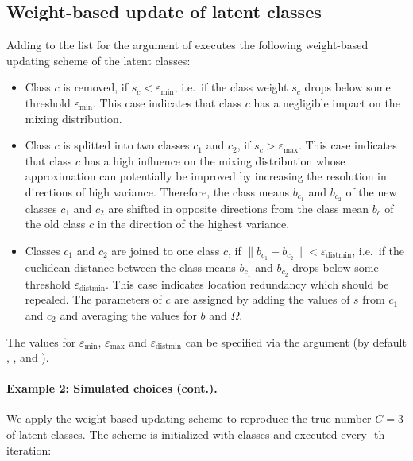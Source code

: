 \documentclass[article,shortnames]{jss}
\newcommand{\fct}[1]{\code{#1()}}
\begin{document}
\subsection{Weight-based update of latent classes} \label{subsec:weight_update}

Adding  to the list for the  argument of \fct{fit\_model} executes the following weight-based updating scheme of the latent classes:

\begin{itemize}
  \item Class $c$ is removed, if $s_c<\varepsilon_{\text{min}}$, i.e.\ if the class weight $s_c$ drops below some threshold $\varepsilon_{\text{min}}$. This case indicates that class $c$ has a negligible impact on the mixing distribution.
  \item Class $c$ is splitted into two classes $c_1$ and $c_2$, if $s_c>\varepsilon_\text{max}$. This case indicates that class $c$ has a high influence on the mixing distribution whose approximation can potentially be improved by increasing the resolution in directions of high variance. Therefore, the class means $b_{c_1}$ and $b_{c_2}$ of the new classes $c_1$ and $c_2$ are shifted in opposite directions from the class mean $b_c$ of the old class $c$ in the direction of the highest variance.
  \item Classes $c_1$ and $c_2$ are joined to one class $c$, if $\lVert b_{c_1} - b_{c_2} \rVert<\varepsilon_{\text{distmin}}$, i.e.\ if the euclidean distance between the class means $b_{c_1}$ and $b_{c_2}$  drops below some threshold $\varepsilon_{\text{distmin}}$. This case indicates location redundancy which should be repealed. The parameters of $c$ are assigned by adding the values of $s$ from $c_1$ and $c_2$ and averaging the values for $b$ and $\Omega$.
\end{itemize}

The values for $\varepsilon_{\text{min}}$, $\varepsilon_{\text{max}}$ and $\varepsilon_{\text{distmin}}$ can be specified via the  argument (by default , , and ).

\paragraph{Example 2: Simulated choices (cont.).}

We apply the weight-based updating scheme to reproduce the true number $C = 3$ of latent classes. The scheme is initialized with  classes and executed every -th iteration:
\end{document}

